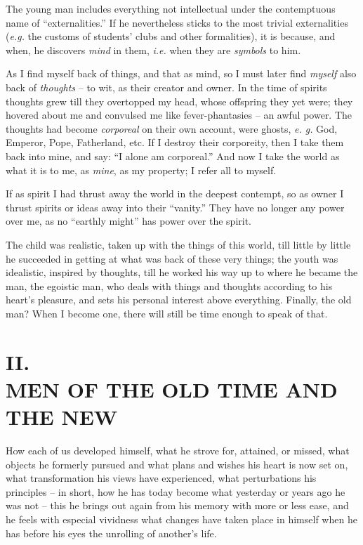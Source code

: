 \documentclass[12pt,a4paper]{book}
\begin{document}
The young man includes everything not intellectual under the contemptuous name 
of ``externalities.'' If he nevertheless sticks to the most trivial 
externalities (\textit{e.g.} the customs of students' clubs and other 
formalities), it is because, and when, he discovers \textit{mind} in them, 
\textit{i.e.} when they are \textit{symbols} to him.

As I find myself back of things, and that as mind, so I must later find 
\textit{myself} also back of \textit{thoughts} -- to wit, as their creator and 
owner. In the time of spirits thoughts grew till they overtopped my head, 
whose offspring they yet were; they hovered about me and convulsed me like 
fever-phantasies -- an awful power. The thoughts had become \textit{corporeal} 
on their own account, were ghosts, \textit{e. g.} God, Emperor, Pope, 
Fatherland, etc. If I destroy their corporeity, then I take them back into 
mine, and say: ``I alone am corporeal.'' And now I take the world as what it 
is to me, as \textit{mine}, as my property; I refer all to myself.

If as spirit I had thrust away the world in the deepest contempt, so as owner 
I thrust spirits or ideas away into their ``vanity.'' They have no longer 
any power over me, as no ``earthly might'' has power over the spirit.

The child was realistic, taken up with the things of this world, till little 
by little he succeeded in getting at what was back of these very things; the 
youth was idealistic, inspired by thoughts, till he worked his way up to where 
he became the man, the egoistic man, who deals with things and thoughts 
according to his heart's pleasure, and sets his personal interest above 
everything. Finally, the old man? When I become one, there will still be time 
enough to speak of that.

\chapter[II. Men Of The Old And The New]{\centering II.\\
MEN OF THE OLD TIME AND THE NEW}

\medskip{}

\noindent{}How each of us developed himself, what he strove for, attained, or 
missed, what objects he formerly pursued and what plans and wishes his heart 
is now set on, what transformation his views have experienced, what 
perturbations his principles -- in short, how he has today become what 
yesterday or years ago he was not -- this he brings out again from his memory 
with more or less ease, and he feels with especial vividness what changes have 
taken place in himself when he has before his eyes the unrolling of another's 
life.
\end{document}
